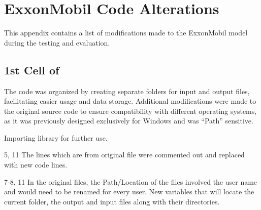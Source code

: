 \chapter{ExxonMobil Code Alterations}
\label{ch:appendixexxonmobil}
This appendix contains a list of modifications made to the ExxonMobil model during the testing and evaluation.

 

\section{1st Cell of }

The code was organized by creating separate folders for input and output files, facilitating easier usage and data storage. Additional modifications were made to the original source code to ensure compatibility with different operating systems, as it was previously designed exclusively for Windows and was ``Path'' sensitive.

\begin{codemodifications}

\begin{codemodification}{1}
Importing  library for further use.
\end{codemodification}

\begin{codemodification}{5, 11}
The lines which are from original file were commented out and replaced with new code lines.
\end{codemodification}

\begin{codemodification}{7-8, 11}
In the original files, the Path/Location of the files involved the user name and would need to be renamed for every user.  New variables that will locate the current folder, the output and input files along with their directories.
\end{codemodification}

\end{codemodifications}

